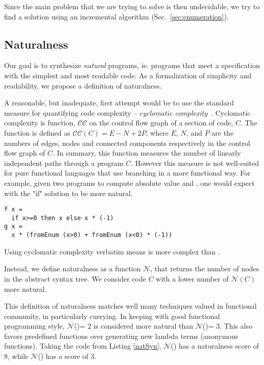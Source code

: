 Since the main problem that we are trying to solve is then undecidable, we try to find a solution using an incremental algorithm (Sec.~\ref{sec:enumeration}).
 

\subsection{Naturalness}
\label{sec:naturalness}

Our goal is to synthesize \textit{natural} programs, ie. programs that meet a specification with the simplest and most readable code.
As a formalization of simplicity and readability, we propose a definition of naturalness.

A reasonable, but inadequate, first attempt would be to use the standard measure for quantifying code complexity --  {\emph{cyclomatic complexity}}~\cite{McCabe:1976:CM:800253.807712}.
Cyclomatic complexity is function, $\mathcal{CC}$ on the control flow graph of a section of code, $C$.
The function is defined as $\mathcal{CC}(C) = E − N + 2P$, where $E$, $N$, and $P$ are the numbers of edges, nodes and connected components respectively in the control flow graph of $C$.
In summary, this function measures the number of linearly independent paths through a program $C$.
However this measure is not well-suited for pure functional languages that use branching in a more functional way.
For example, given two programs to compute absolute value  and , one would expect  with the "if" solution to be more natural.
\begin{lstlisting}
f x =
  if x>=0 then x else x * (-1)
g x = 
  x * (fromEnum (x>0) + fromEnum (x<0) * (-1))
\end{lstlisting}
Using cyclomatic complexity verbatim means  is more complex than .

Instead, we define naturalness as a function $\mathcal{N}$, that returns the number of nodes in the abstract syntax tree. We consider code $C$ with a lower 
number of $\mathcal{N}(C)$ more natural.

This definition of naturalness matches well many techniques valued in functional community, in particularly 
currying.
In keeping with good functional programming style, 
$\mathcal{N}$()= 2 is considered more natural than $\mathcal{N}$()= 3.
This also favors predefined functions over generating new lambda terms (anonymous functions).
Taking the code from Listing \ref{natSyn}, $\mathcal{N}$() has a naturalness score of 8, while $\mathcal{N}$() has a score of 3.

